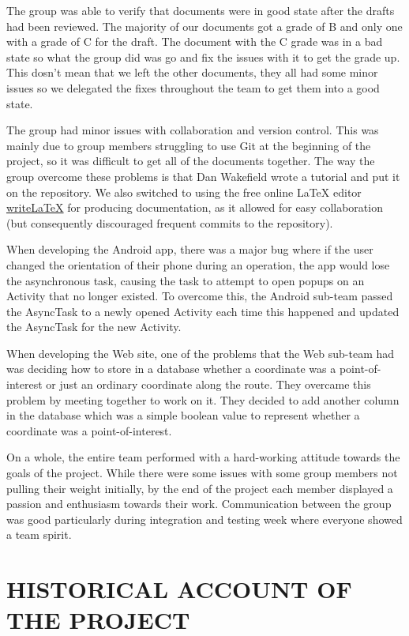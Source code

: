\documentclass{project}
\begin{document}
The group was able to verify that documents were in good state after the drafts had been reviewed. The majority of our documents got a grade of B and only one with a grade of C for the draft. The document with the C grade was in a bad state so what the group did was go and fix the issues with it to get the grade up. This dosn't mean that we left the other documents, they all had some minor issues so we delegated the fixes throughout the team to get them into a good state.

The group had minor issues with collaboration and version control. This was mainly due to group members struggling to use Git at the beginning of the project, so it was difficult to get all of the documents together. The way the group overcome these problems is that Dan Wakefield wrote a tutorial and put it on the repository. We also switched to using the free online \LaTeX{} editor \href{http://www.writelatex.com}{write\LaTeX{}} for producing documentation, as it allowed for easy collaboration (but consequently discouraged frequent commits to the repository).    

When developing the Android app, there was a major bug where if the user changed the orientation of their phone during an operation, the app would lose the asynchronous task, causing the task to attempt to open popups on an Activity that no longer existed. To overcome this, the Android sub-team passed the AsyncTask to a newly opened Activity each time this happened and updated the AsyncTask for the new Activity.

When developing the Web site, one of the problems that the Web sub-team had was deciding how to store in a database whether a coordinate was a point-of-interest or just an ordinary coordinate along the route. They overcame this problem by meeting together to work on it. They decided to add another column in the database which was a simple boolean value to represent whether a coordinate was a point-of-interest.

On a whole, the entire team performed with a hard-working attitude towards the goals of the project. While there were some issues with some group members not pulling their weight initially, by the end of the project each member displayed a passion and enthusiasm towards their work. Communication between the group was good particularly during integration and testing week where everyone showed a team spirit.


\newpage


\section{HISTORICAL ACCOUNT OF THE PROJECT}
\end{document}

